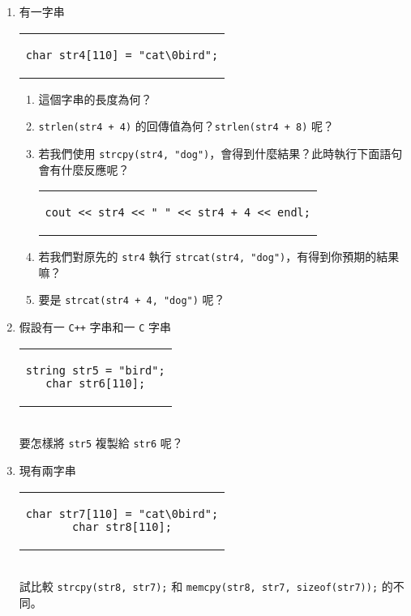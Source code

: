 \documentclass[12pt,a4paper,oneside]{report}
\begin{document}
\begin{CJK}{UTF8}{bkai}
\begin{enumerate}
\begin{enumerate}
  \end{enumerate}
\item 有一字串
\begin{code}[h!]
  \centering
  \begin{tabular}{c}
  \begin{lstlisting}
char str4[110] = "cat\0bird";
  \end{lstlisting}
  \end{tabular}
\end{code}
  \begin{enumerate}
  \item 這個字串的長度為何？
  \item \lstinline!strlen(str4 + 4)! 的回傳值為何？\lstinline!strlen(str4 + 8)! 呢？
  \item 若我們使用 \lstinline!strcpy(str4, "dog")!，會得到什麼結果？此時執行下面語句會有什麼反應呢？
  \begin{code}[h!]
    \centering
    \begin{tabular}{c}
    \begin{lstlisting}
cout << str4 << " " << str4 + 4 << endl;
    \end{lstlisting}
    \end{tabular}
  \end{code}
  \item 若我們對原先的 \lstinline!str4! 執行 \lstinline!strcat(str4, "dog")!，有得到你預期的結果嘛？
  \item 要是 \lstinline!strcat(str4 + 4, "dog")! 呢？
  \end{enumerate}
\item 假設有一 \texttt{C++} 字串和一 \texttt{C} 字串
\begin{code}[h!]
  \centering
  \begin{tabular}{c}
  \begin{lstlisting}
string str5 = "bird";
char str6[110];
  \end{lstlisting}
  \end{tabular}
\end{code}
\\要怎樣將 \lstinline!str5! 複製給 \lstinline!str6! 呢？
\item 現有兩字串
\begin{code}[h!]
  \centering
  \begin{tabular}{c}
  \begin{lstlisting}
char str7[110] = "cat\0bird";
char str8[110];
  \end{lstlisting}
  \end{tabular}
\end{code}
\\試比較 \lstinline!strcpy(str8, str7);! 和 \lstinline!memcpy(str8, str7, sizeof(str7));! 的不同。
\end{enumerate}


\end{CJK}
\end{document}
